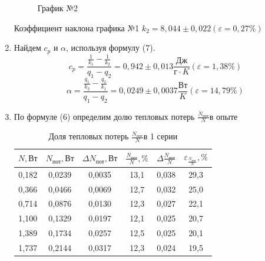 \documentclass[a4paper]{article}
\begin{document}
\begin{enumerate}
\begin{figure}[h!]
\caption[]{\label{fig:3} График №2}
\end{figure}

Коэффициент наклона графика №1 $k_2 = 8,044 \pm 0,022 (\varepsilon = 0,27\%)$ \newline



\item Найдем $c_{p}$ и $\alpha$, используя формулу (7).
\begin{equation*}
	c_{p} = \frac{\frac{1}{k_1}-\frac{1}{k_2}}{q_1-q_2} = 0,942 \pm 0,013 \frac{\text{Дж}}{г\cdot K} (\varepsilon = 1,38\%)
\end{equation*}
\begin{equation*}
	\alpha = \frac{\frac{q_1}{k_2} - \frac{q_2}{k_1}}{q_1-q_2} = 0,0249 \pm 0,0037 \frac{\text{Вт}}{K}(\varepsilon = 14,79\%)
\end{equation*}

\item По формуле (6) определим долю тепловых потерь $\frac{N_{\text{пот}}}{N}$в опыте

\begin{table}[h!] 
	\caption{Доля тепловых потерь $\frac{N_{\text{пот}}}{N}$в 1 серии}
	\begin{center}
		\begin{tabular}{|*{6}{c|}}
			\hline
			$N,  \text{Вт} $ & $N_{\text{пот}}, \text{Вт}$ & $\Delta N_{\text{пот}}, \text{Вт}$ & $\frac{N_{\text{пот}}}{N}, \%$ & $\Delta \frac{N_{\text{пот}}}{N}$ & $\varepsilon_{\frac{N_{\text{пот}}}{N}}, \%$\\ \hline
			0,182	&0,0239&	0,0035	&13,1	&0,038	&29,3\\ \hline
			0,366	&0,0466	&0,0069	&12,7	&0,032	&25,0\\ \hline
			0,714	&0,0876&	0,0130	&12,3&	0,027&	22,1\\ \hline
			1,100	&0,1329	&0,0197	&12,1	&0,025&	20,7\\ \hline
			1,389	&0,1734&	0,0257	&12,5 &	0,025&	20,1\\ \hline
			1,737	&0,2144&	0,0317&	12,3 &	0,024&	19,5\\ \hline
		\end{tabular}
	\end{center}
\end{table}


\end{enumerate}
\end{document}
